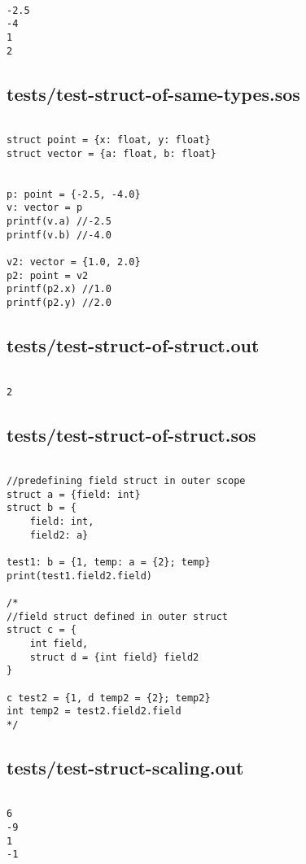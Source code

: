 \documentclass[main.tex]{subfiles}
\begin{document}
\begin{lstlisting}

-2.5
-4
1
2
\end{lstlisting}

\subsection{tests/test-struct-of-same-types.sos}

\begin{lstlisting}

struct point = {x: float, y: float}
struct vector = {a: float, b: float}


p: point = {-2.5, -4.0}
v: vector = p
printf(v.a) //-2.5
printf(v.b) //-4.0

v2: vector = {1.0, 2.0}
p2: point = v2
printf(p2.x) //1.0
printf(p2.y) //2.0
\end{lstlisting}

\subsection{tests/test-struct-of-struct.out}

\begin{lstlisting}

2
\end{lstlisting}

\subsection{tests/test-struct-of-struct.sos}

\begin{lstlisting}

//predefining field struct in outer scope
struct a = {field: int}
struct b = { 
    field: int,
    field2: a}

test1: b = {1, temp: a = {2}; temp}
print(test1.field2.field)

/*
//field struct defined in outer struct
struct c = {
    int field,
    struct d = {int field} field2
}

c test2 = {1, d temp2 = {2}; temp2}
int temp2 = test2.field2.field
*/
\end{lstlisting}

\subsection{tests/test-struct-scaling.out}

\begin{lstlisting}

6
-9
1
-1
\end{lstlisting}
\end{document}
